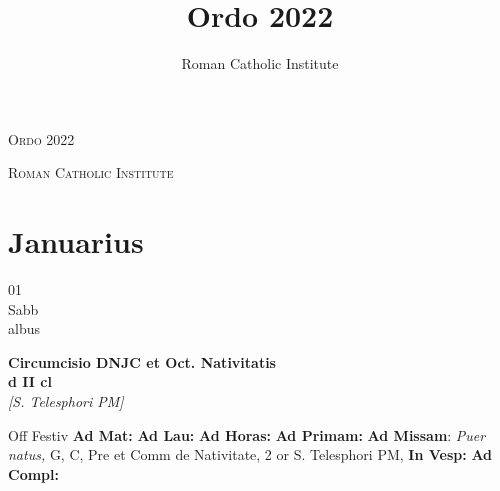 \documentclass[10pt, openany]{book}
\title{Ordo 2022}
\author{Roman Catholic Institute}
\begin{document}
    \begin{titlepage}
        \begin{center}
            {\fontsize{50}{60}\selectfont \textsc{Ordo 2022}}
        \end{center}
        \begin{center}
            {\footnotesize \textsc{Roman Catholic Institute}}
        \end{center}
    \end{titlepage}
    \clearpage\begingroup\pagestyle{empty}\cleardoublepage\endgroup

    \chapter{Januarius}
                    
    \begin{center}
        \begin{minipage}{3.5in}
            \vspace{2em}
            \begin{minipage}{0.5in}
                {\Huge 01} \\
                {\normalsize Sabb} \\
                {\normalsize albus}
            \end{minipage}
            \begin{minipage}{3.0in}
                \textbf{ \large Circumcisio DNJC et Oct. Nativitatis \\
                \textnormal{\normalsize d II cl}} \\ \textit{[S. Telesphori PM]} \\ 
            \end{minipage}
            \begin{justify}Off Festiv
                \textbf{Ad Mat: }
                \textbf{Ad Lau: }
                \textbf{Ad Horas: }
                \textbf{Ad Primam: }\textbf{Ad Missam}: \textit{Puer natus,} G, C, Pre et Comm de Nativitate, 2 or S. Telesphori PM,  
                \textbf{In Vesp: }
                \textbf{Ad Compl: }
            \end{justify}
        \end{minipage}
    \end{center}
\end{document}
